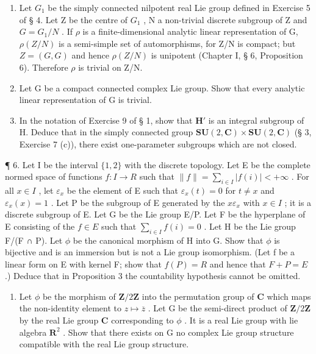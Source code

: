 \begin{enumerate}
\def\labelenumi{\arabic{enumi}.}
\setcounter{enumi}{2}
\item
  Let \(G_{1}\) be the simply connected nilpotent real Lie group defined in Exercise 5 of § 4. Let Z be the centre of \(G_{1}\) , N a non-trivial discrete subgroup of Z and \(G = G_{1}/N\) . If \(\rho\) is a finite-dimensional analytic linear representation of G, \(\rho(Z/N)\) is a semi-simple set of automorphisms, for Z/N is compact; but \(Z = (G, G)\) and hence \(\rho(Z/N)\) is unipotent (Chapter I, § 6, Proposition 6). Therefore \(\rho\) is trivial on Z/N.
\item
  Let G be a compact connected complex Lie group. Show that every analytic linear representation of G is trivial.
\item
  In the notation of Exercise 9 of § 1, show that \(\mathbf{H}'\) is an integral subgroup of H. Deduce that in the simply connected group \(\mathbf{SU}(2,\mathbf{C})\times \mathbf{SU}(2,\mathbf{C})\) (§ 3, Exercise 7 (c)), there exist one-parameter subgroups which are not closed.
\end{enumerate}

¶ 6. Let I be the interval \(\{1,2\}\) with the discrete topology. Let E be the complete normed space of functions \(f: I \to R\) such that \(\|f\| = \sum_{i \in I} |f(i)| < +\infty\) . For all \(x \in I\) , let \(\varepsilon_x\) be the element of E such that \(\varepsilon_x(t) = 0\) for \(t \neq x\) and \(\varepsilon_x(x) = 1\) . Let P be the subgroup of E generated by the \(x\varepsilon_x\) with \(x \in I\) ; it is a discrete subgroup of E. Let G be the Lie group E/P. Let F be the hyperplane of E consisting of the \(f \in E\) such that \(\sum_{i \in I} f(i) = 0\) . Let H be the Lie group F/(F ∩ P). Let \(\phi\) be the canonical morphism of H into G. Show that \(\phi\) is bijective and is an immersion but is not a Lie group isomorphism. (Let f be a linear form on E with kernel F; show that \(f(P) = R\) and hence that \(F + P = E\) .) Deduce that in Proposition 3 the countability hypothesis cannot be omitted.

\begin{enumerate}
\def\labelenumi{\arabic{enumi}.}
\setcounter{enumi}{6}
\tightlist
\item
  Let \(\phi\) be the morphism of \(\mathbf{Z} / 2\mathbf{Z}\) into the permutation group of \(\mathbf{C}\) which maps the non-identity element to \(z\mapsto \overline{z}\) . Let \(\mathrm{G}\) be the semi-direct product of \(\mathbf{Z} / 2\mathbf{Z}\) by the real Lie group \(\mathbf{C}\) corresponding to \(\phi\) . It is a real Lie group with lie algebra \(\mathbf{R}^2\) . Show that there exists on \(\mathrm{G}\) no complex Lie group structure compatible with the real Lie group structure.
\end{enumerate}

